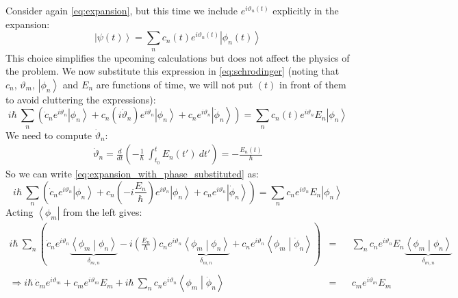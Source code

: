 \documentclass[12pt,a4paper]{article}
\begin{document}
	Consider again \eqref{eq:expansion}, but this time we include $e^{i \vartheta_{n}(t)}$ explicitly in the expansion:
	\begin{equation}
		\left| \psi(t) \right\rangle = \sum_{n} c_{n}(t) e^{i \vartheta_{n}(t)} \left| \phi_{n}(t) \right\rangle
		\label{eq:expansion_with_phase}
	\end{equation}
	This choice simplifies the upcoming calculations but does not affect the physics of the problem. We now substitute this expression in \eqref{eq:schrodinger} (noting that $c_{n}$, $\vartheta_{m}$, $\left| \phi_{n} \right\rangle$ and $E_{n}$ are functions of time, we will not put $(t)$ in front of them to avoid cluttering the expressions):
	\begin{equation}
		i \hbar\ \sum_{n} \left( \dot{c}_{n} e^{i \vartheta_{n}} \left| \phi_{n} \right\rangle + c_{n}\left( i \dot{\vartheta}_{n} \right) e^{i \vartheta_{n}}  \left| \phi_{n} \right\rangle  + c_{n} e^{i \vartheta_{n}} \left| \dot{\phi}_{n} \right\rangle \right) = \sum_{n} c_{n}(t) e^{i \vartheta_{n}} E_{n} \left| \phi_{n} \right\rangle
		\label{eq:expansion_with_phase_substituted}
	\end{equation}
	We need to compute $\dot{\vartheta}_{n}$:
	\begin{eqnarray}
		\dot{\vartheta}_{n} = \frac{d}{dt} \left(-\frac{1}{\hbar}\ \int_{t_{0}}^{t} E_{n}(t')\ dt' \right) = -\frac{E_{n}(t)}{\hbar}
		\label{eq:theta_dot}
	\end{eqnarray}
	So we can write \eqref{eq:expansion_with_phase_substituted} as:
	\begin{equation}
		i \hbar\ \sum_{n} \left( \dot{c}_{n} e^{i \vartheta_{n}} \left| \phi_{n} \right\rangle + c_{n}\left( -i \dfrac{E_{n}}{\hbar} \right) e^{i \vartheta_{n}}  \left| \phi_{n} \right\rangle  + c_{n} e^{i \vartheta_{n}} \left| \dot{\phi}_{n} \right\rangle \right) = \sum_{n} c_{n} e^{i \vartheta_{n}} E_{n} \left| \phi_{n} \right\rangle
		\label{eq:expansion_with_phase_simplified}
	\end{equation}
	Acting $\left\langle \phi_{m} \right|$ from the left gives:
	\begin{align}
		i \hbar\ \sum_{n} \left( \dot{c}_{n} e^{i \vartheta_{n}} \underbrace{\left\langle \phi_{m} \middle| \phi_{n} \right\rangle}_{\delta_{m,n}} - i \left(\frac{E_{n}}{\hbar} \right) c_{n} e^{i \vartheta_{n}} \underbrace{\left\langle \phi_{m} \middle| \phi_{n} \right\rangle}_{\delta_{m,n}}  + c_{n} e^{i \vartheta_{n}} \left\langle \phi_{m} \middle| \dot{\phi}_{n} \right\rangle \right) &=&& \sum_{n} c_{n} e^{i \vartheta_{n}} E_{n} \underbrace{\left\langle \phi_{m} \middle| \phi_{n} \right\rangle}_{\delta_{m,n}} \nonumber\\
		\\
		\Rightarrow i \hbar\ \dot{c}_{m} e^{i \vartheta_{m}} + c_{m} e^{i \vartheta_{m}} E_{m} + i \hbar\ \sum_{n} c_{n} e^{i \vartheta_{n}} \left\langle \phi_{m} \middle| \dot{\phi}_{n} \right\rangle &=&& c_{m} e^{i \vartheta_{m}} E_{m}
		\label{eq:projected_with_phase}
	\end{align}
\end{document}
